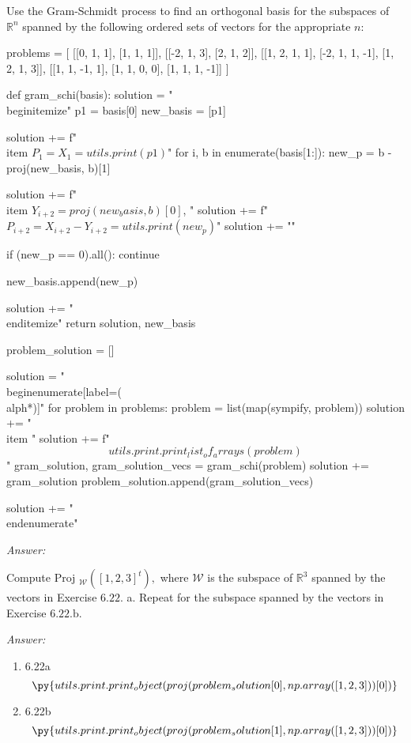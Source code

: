 \documentclass[letterpaper]{article}
\newcommand{\ans}{\textit{Answer: }}
\newenvironment{question}[2][Question]{\begin{trivlist}
\item[\hskip \labelsep {\bfseries #1}\hskip \labelsep {\bfseries #2.}]}{\end{trivlist}}
\newcommand{\printobj}[1]{\py{utils.print.print_object(#1)}}
\begin{document}
\begin{question}{6.22}
  Use the Gram-Schmidt process to find an orthogonal basis for the subspaces
  of $\mathbb{R}^{n}$ spanned by the following ordered sets of vectors for the appropriate $n :$
  
  \begin{pycode}
problems = [
  [[0, 1, 1], [1, 1, 1]],
  [[-2, 1, 3], [2, 1, 2]],
  [[1, 2, 1, 1], [-2, 1, 1, -1], [1, 2, 1, 3]],
  [[1, 1, -1, 1], [1, 1, 0, 0], [1, 1, 1, -1]]
]

def gram_schi(basis):
  solution = "\\begin{itemize}\n"
  p1 = basis[0]
  new_basis = [p1]

  solution += f"\\item $P_1 = X_1 = {utils.print(p1)}$\n"
  for i, b in enumerate(basis[1:]):
    new_p = b - proj(new_basis, b)[1]

    solution += f"\\item $Y_{i+2} = {proj(new_basis, b)[0]}$, "
    solution += f"$P_{i+2} = X_{i+2} - Y_{i+2} = {utils.print(new_p)}$"
    solution += "\n"

    if (new_p == 0).all():
      continue

    new_basis.append(new_p)

  solution += "\\end{itemize}\n\n"
  return solution, new_basis

problem_solution = []

solution = "\\begin{enumerate}[label=(\\alph*)]"
for problem in problems:
  problem = list(map(sympify, problem))
  solution += "\\item "
  solution += f"$${utils.print.print_list_of_arrays(problem)}$$"
  gram_solution, gram_solution_vecs = gram_schi(problem)
  solution += gram_solution
  problem_solution.append(gram_solution_vecs)

solution += "\\end{enumerate}"
  \end{pycode}

  \ans 
\end{question}

\begin{question}{6.23}
  Compute Proj $_{\mathcal{W}}\left([1,2,3]^{t}\right),$ where $\mathcal{W}$ is the subspace of $\mathbb{R}^{3}$ spanned by the
  vectors in Exercise $6.22 .$ a. Repeat for the subspace spanned by the vectors in
  Exercise $6.22 . \mathrm{b} .$

  \ans 

  \begin{enumerate}[label=(\alph*)]
    \item 6.22a 
    $$\printobj{proj(problem_solution[0], np.array([1,2,3]))[0]}$$
    \item 6.22b 
    $$\printobj{proj(problem_solution[1], np.array([1,2,3]))[0]}$$
  \end{enumerate}
  
\end{question}
\end{document}
